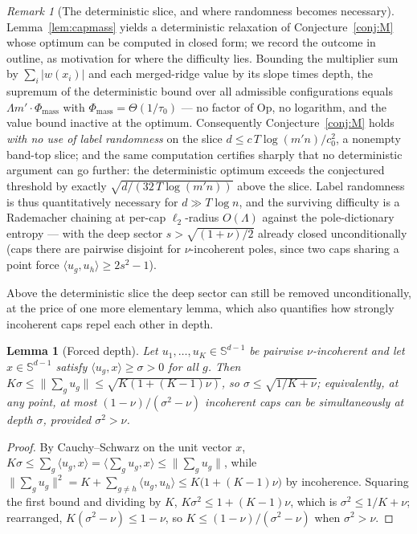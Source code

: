 \documentclass[11pt,reqno]{amsart}
\theoremstyle{plain}
\newtheorem{lemma}[theorem]{Lemma}
\theoremstyle{definition}
\theoremstyle{remark}
\newtheorem{remark}[theorem]{Remark}
\newcommand{\Sd}{\mathbb{S}^{d-1}}
\newcommand{\inn}[2]{\langle #1,#2\rangle}
\begin{document}
\begin{remark}[The deterministic slice, and where randomness becomes necessary]\label{rem:detslice}
Lemma~\ref{lem:capmass} yields a deterministic relaxation of Conjecture~\ref{conj:M} whose optimum can be computed in closed form; we record the outcome in outline, as motivation for where the difficulty lies. Bounding the multiplier sum by $\sum_i|w(x_i)|$ and each merged-ridge value by its slope times depth, the supremum of the deterministic bound over all admissible configurations equals $\Lambda m'\cdot\Phi_{\mathrm{mass}}$ with $\Phi_{\mathrm{mass}}=\Theta(1/\tau_0)$ --- no factor of $\mathrm{Op}$, no logarithm, and the value bound inactive at the optimum. Consequently Conjecture~\ref{conj:M} holds \emph{with no use of label randomness} on the slice $d\le c\,T\log(m'n)/c_0^2$, a nonempty band-top slice; and the same computation certifies sharply that no deterministic argument can go further: the deterministic optimum exceeds the conjectured threshold by exactly $\sqrt{d/(32\,T\log(m'n))}$ above the slice. Label randomness is thus quantitatively necessary for $d\gg T\log n$, and the surviving difficulty is a Rademacher chaining at per-cap $\ell_2$-radius $O(\Lambda)$ against the pole-dictionary entropy --- with the deep sector $s>\sqrt{(1+\nu)/2}$ already closed unconditionally (caps there are pairwise disjoint for $\nu$-incoherent poles, since two caps sharing a point force $\inn{u_g}{u_h}\ge2s^2-1$).
\end{remark}

Above the deterministic slice the deep sector can still be removed unconditionally, at the price of one more elementary lemma, which also quantifies how strongly incoherent caps repel each other in depth.

\begin{lemma}[Forced depth]\label{lem:forceddepth}
Let $u_1,\dots,u_K\in\Sd$ be pairwise $\nu$-incoherent and let $x\in\Sd$ satisfy $\inn{u_g}x\ge\sigma>0$ for all $g$. Then $K\sigma\le\|\sum_gu_g\|\le\sqrt{K(1+(K-1)\nu)}$, so $\sigma\le\sqrt{1/K+\nu}$; equivalently, at any point, at most $(1-\nu)/(\sigma^2-\nu)$ incoherent caps can be simultaneously at depth $\sigma$, provided $\sigma^2>\nu$.
\end{lemma}
\begin{proof}[Proof]
By Cauchy--Schwarz on the unit vector $x$, $K\sigma\le\sum_g\inn{u_g}x=\inn{\textstyle\sum_gu_g}{x}\le\|\sum_gu_g\|$, while $\|\sum_gu_g\|^2=K+\sum_{g\ne h}\inn{u_g}{u_h}\le K\bigl(1+(K-1)\nu\bigr)$ by incoherence. Squaring the first bound and dividing by $K$, $K\sigma^2\le1+(K-1)\nu$, which is $\sigma^2\le1/K+\nu$; rearranged, $K(\sigma^2-\nu)\le1-\nu$, so $K\le(1-\nu)/(\sigma^2-\nu)$ when $\sigma^2>\nu$.
\end{proof}
\end{document}
